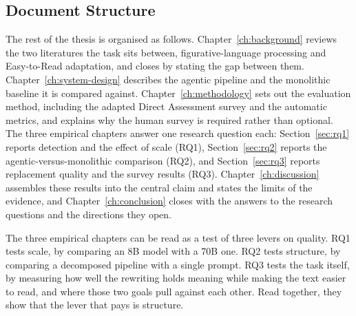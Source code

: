 \subsection{Document Structure}

The rest of the thesis is organised as follows.
Chapter~\ref{ch:background} reviews the two literatures the task sits between,
figurative-language processing and Easy-to-Read adaptation, and closes by
stating the gap between them.
Chapter~\ref{ch:system-design} describes the agentic pipeline and the
monolithic baseline it is compared against.
Chapter~\ref{ch:methodology} sets out the evaluation method, including the
adapted Direct Assessment survey and the automatic metrics, and explains why
the human survey is required rather than optional.
The three empirical chapters answer one research question each:
Section~\ref{sec:rq1} reports detection and the effect of scale (RQ1),
Section~\ref{sec:rq2} reports the agentic-versus-monolithic comparison (RQ2),
and Section~\ref{sec:rq3} reports replacement quality and the survey results
(RQ3).
Chapter~\ref{ch:discussion} assembles these results into the central claim and
states the limits of the evidence, and
Chapter~\ref{ch:conclusion} closes with the answers to the research questions
and the directions they open.

The three empirical chapters can be read as a test of three levers on quality.
RQ1 tests scale, by comparing an 8B model with a 70B one. RQ2 tests structure,
by comparing a decomposed pipeline with a single prompt. RQ3 tests the task
itself, by measuring how well the rewriting holds meaning while making the text
easier to read, and where those two goals pull against each other. Read
together, they show that the lever that pays is structure.

\newpage
